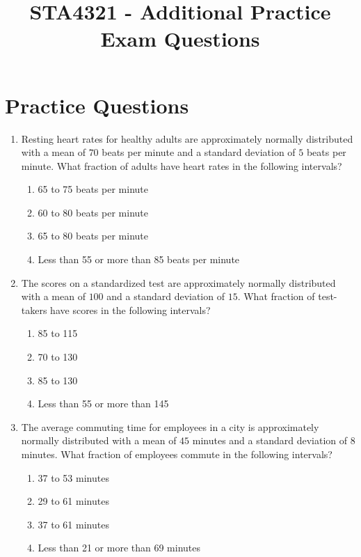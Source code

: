 \documentclass[11pt]{article}
\begin{document}
\title{STA4321 - Additional Practice Exam Questions}
\date{}
\maketitle

\section*{Practice Questions}

\begin{enumerate}

\item Resting heart rates for healthy adults are approximately normally distributed with a mean of $70$ beats per minute and a standard deviation of $5$ beats per minute. What fraction of adults have heart rates in the following intervals?
\begin{enumerate}
    \item 65 to 75 beats per minute
    \item 60 to 80 beats per minute
    \item 65 to 80 beats per minute
    \item Less than 55 or more than 85 beats per minute
\end{enumerate}

\item The scores on a standardized test are approximately normally distributed with a mean of $100$ and a standard deviation of $15$. What fraction of test-takers have scores in the following intervals?
\begin{enumerate}
    \item 85 to 115 
    \item 70 to 130 
    \item 85 to 130 
    \item Less than 55 or more than 145 
\end{enumerate}

\item The average commuting time for employees in a city is approximately normally distributed with a mean of $45$ minutes and a standard deviation of $8$ minutes. What fraction of employees commute in the following intervals?
\begin{enumerate}
    \item 37 to 53 minutes
    \item 29 to 61 minutes
    \item 37 to 61 minutes
    \item Less than 21 or more than 69 minutes
\end{enumerate}


\end{enumerate}
\end{document}
